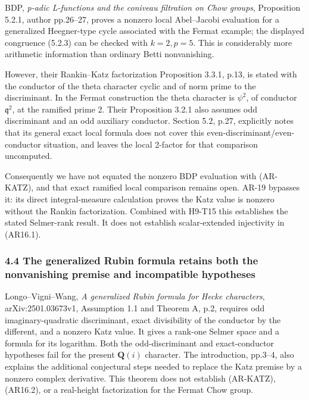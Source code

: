 \documentclass[11pt,a4paper]{article}
\begin{document}
BDP, \emph{p-adic L-functions and the coniveau filtration on Chow
groups}, Proposition 5.2.1, author pp.26--27, proves a nonzero local
Abel--Jacobi evaluation for a generalized Heegner-type cycle associated
with the Fermat example; the displayed congruence (5.2.3) can be checked
with \(k=2,p=5\). This is considerably more arithmetic information than
ordinary Betti nonvanishing.

However, their Rankin--Katz factorization Proposition 3.3.1, p.13, is
stated with the conductor of the theta character cyclic and of norm
prime to the discriminant. In the Fermat construction the theta
character is \(\psi^2\), of conductor \(\mathfrak q^2\), at the ramified
prime 2. Their Proposition 3.2.1 also assumes odd discriminant and an
odd auxiliary conductor. Section 5.2, p.27, explicitly notes that its
general exact local formula does not cover this
even-discriminant/even-conductor situation, and leaves the local
2-factor for that comparison uncomputed.

Consequently we have not equated the nonzero BDP evaluation with
(AR-KATZ), and that exact ramified local comparison remains open. AR-19
bypasses it: its direct integral-measure calculation proves the Katz
value is nonzero without the Rankin factorization. Combined with H9-T15
this establishes the stated Selmer-rank result. It does not establish
scalar-extended injectivity in (AR16.1).

\subsubsection{4.4 The generalized Rubin formula retains both the
nonvanishing premise and incompatible
hypotheses}\label{the-generalized-rubin-formula-retains-both-the-nonvanishing-premise-and-incompatible-hypotheses}

Longo--Vigni--Wang, \emph{A generalized Rubin formula for Hecke
characters}, arXiv:2501.03673v1, Assumption 1.1 and Theorem A, p.2,
requires odd imaginary-quadratic discriminant, exact divisibility of the
conductor by the different, and a nonzero Katz value. It gives a
rank-one Selmer space and a formula for its logarithm. Both the
odd-discriminant and exact-conductor hypotheses fail for the present
\(\mathbf Q(i)\) character. The introduction, pp.3--4, also explains the
additional conjectural steps needed to replace the Katz premise by a
nonzero complex derivative. This theorem does not establish (AR-KATZ),
(AR16.2), or a real-height factorization for the Fermat Chow group.
\end{document}
